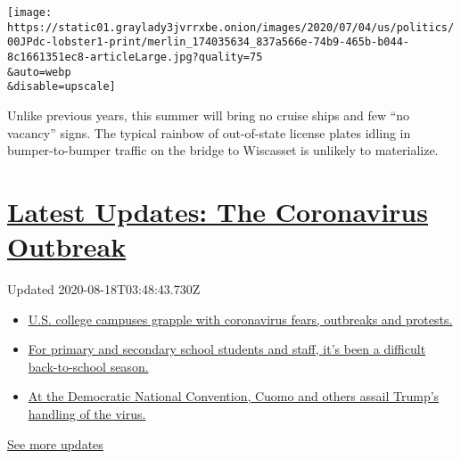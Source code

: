 \texttt{[image: https://static01.graylady3jvrrxbe.onion/images/2020/07/04/us/politics/00JPdc-lobster1-print/merlin\_174035634\_837a566e-74b9-465b-b044-8c1661351ec8-articleLarge.jpg?quality=75\\\&auto=webp\\\&disable=upscale]}

Unlike previous years, this summer will bring no cruise ships and few
``no vacancy'' signs. The typical rainbow of out-of-state license plates
idling in bumper-to-bumper traffic on the bridge to Wiscasset is
unlikely to materialize.

\hypertarget{latest-updates-the-coronavirus-outbreak}{%
\section{\texorpdfstring{\href{https://www.nytimes3xbfgragh.onion/2020/08/17/world/coronavirus-covid.html?action=click\&pgtype=Article\&state=default\&region=MAIN_CONTENT_1\&context=storylines_live_updates}{Latest
Updates: The Coronavirus
Outbreak}}{Latest Updates: The Coronavirus Outbreak}}\label{latest-updates-the-coronavirus-outbreak}}

Updated 2020-08-18T03:48:43.730Z

\begin{itemize}
\tightlist
\item
  \href{https://www.nytimes3xbfgragh.onion/2020/08/17/world/coronavirus-covid.html?action=click\&pgtype=Article\&state=default\&region=MAIN_CONTENT_1\&context=storylines_live_updates\#link-6fdbc8ef}{U.S.
  college campuses grapple with coronavirus fears, outbreaks and
  protests.}
\item
  \href{https://www.nytimes3xbfgragh.onion/2020/08/17/world/coronavirus-covid.html?action=click\&pgtype=Article\&state=default\&region=MAIN_CONTENT_1\&context=storylines_live_updates\#link-7e47207}{For
  primary and secondary school students and staff, it's been a difficult
  back-to-school season.}
\item
  \href{https://www.nytimes3xbfgragh.onion/2020/08/17/world/coronavirus-covid.html?action=click\&pgtype=Article\&state=default\&region=MAIN_CONTENT_1\&context=storylines_live_updates\#link-44c3fee2}{At
  the Democratic National Convention, Cuomo and others assail Trump's
  handling of the virus.}
\end{itemize}

\href{https://www.nytimes3xbfgragh.onion/2020/08/17/world/coronavirus-covid.html?action=click\&pgtype=Article\&state=default\&region=MAIN_CONTENT_1\&context=storylines_live_updates}{See
more updates}

